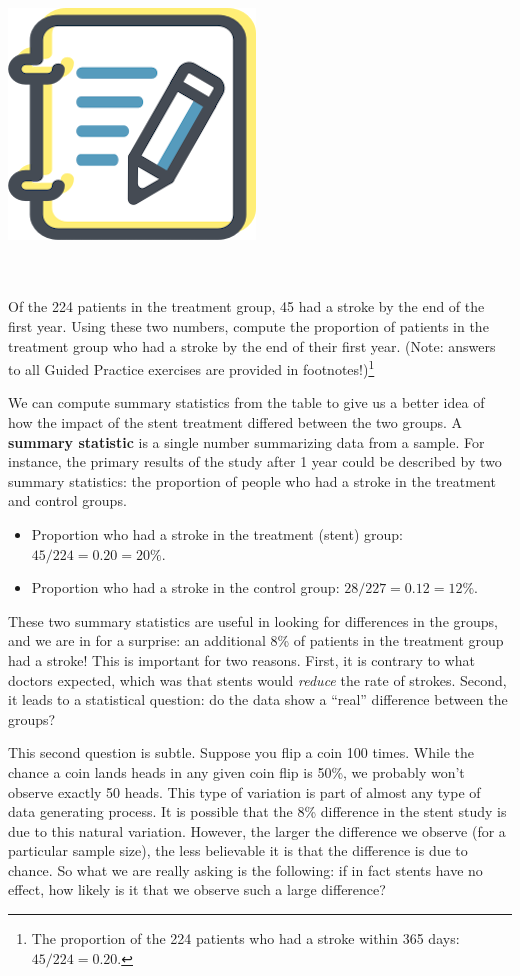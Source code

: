 \documentclass[
  10pt,
  openany]{book}
\providecommand{\tightlist}{%
  \setlength{\itemsep}{0pt}\setlength{\parskip}{0pt}}
\newenvironment{mdframedwithfootGPWE}
{   
    \savenotes
    \begin{mdframed}[%
    topline=true, bottomline=true, linecolor=oiB, linewidth=0.5pt,
    rightline=false, leftline=false,
    backgroundcolor=oiLGray]
    \renewcommand{\thempfootnote}{\arabic{footnote}}
    }
{
    \end{mdframed}
    \spewnotes
}
\newenvironment{guidedpractice}{
\vspace{4mm}
\begin{mdframedwithfootGPWE}
\begin{minipage}[t]{0.10\textwidth}
{$\:$ \\ \setkeys{Gin}{width=2.5em,keepaspectratio}\includegraphics{images/_icons/guided-practice.png}}
\end{minipage}
\hfill
\begin{minipage}[t]{0.90\textwidth}
\vspace{-2mm}
\setlength{\parskip}{1em}
\noindent\textbf{\color{oiB}\small\fontfamily{phv}\selectfont{\MakeUppercase{Guided Practice}}} $\:$ \\ \\
}{\end{minipage}
\end{mdframedwithfootGPWE}
\vspace{4mm}
}
\begin{document}
\begin{guidedpractice}
Of the 224 patients in the treatment group, 45 had a stroke by the end of the first year.
Using these two numbers, compute the proportion of patients in the treatment group who had a stroke by the end of their first year.
(Note: answers to all Guided Practice exercises are provided in footnotes!)\footnote{The proportion of the 224 patients who had a stroke within 365 days: \(45/224 = 0.20.\)}

\end{guidedpractice}

We can compute summary statistics from the table to give us a better idea of how the impact of the stent treatment differed between the two groups.
A \textbf{summary statistic} is a single number summarizing data from a sample.
For instance, the primary results of the study after 1 year could be described by two summary statistics: the proportion of people who had a stroke in the treatment and control groups.

\begin{itemize}
\tightlist
\item
  Proportion who had a stroke in the treatment (stent) group: \(45/224 = 0.20 = 20\%.\)
\item
  Proportion who had a stroke in the control group: \(28/227 = 0.12 = 12\%.\)
\end{itemize}

These two summary statistics are useful in looking for differences in the groups, and we are in for a surprise: an additional 8\% of patients in the treatment group had a stroke!
This is important for two reasons.
First, it is contrary to what doctors expected, which was that stents would \emph{reduce} the rate of strokes.
Second, it leads to a statistical question: do the data show a ``real'' difference between the groups?

This second question is subtle.
Suppose you flip a coin 100 times.
While the chance a coin lands heads in any given coin flip is 50\%, we probably won't observe exactly 50 heads.
This type of variation is part of almost any type of data generating process.
It is possible that the 8\% difference in the stent study is due to this natural variation.
However, the larger the difference we observe (for a particular sample size), the less believable it is that the difference is due to chance.
So what we are really asking is the following: if in fact stents have no effect, how likely is it that we observe such a large difference?
\end{document}
